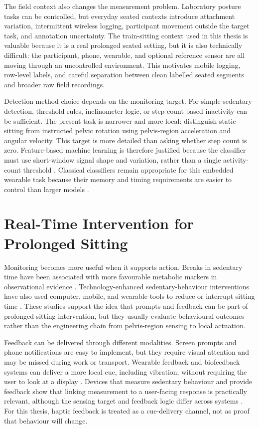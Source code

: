 The field context also changes the measurement problem. Laboratory posture tasks can be controlled, but everyday seated contexts introduce attachment variation, intermittent wireless logging, participant movement outside the target task, and annotation uncertainty. The train-sitting context used in this thesis is valuable because it is a real prolonged seated setting, but it is also technically difficult: the participant, phone, wearable, and optional reference sensor are all moving through an uncontrolled environment. This motivates mobile logging, row-level labels, and careful separation between clean labelled seated segments and broader raw field recordings.

Detection method choice depends on the monitoring target. For simple sedentary detection, threshold rules, inclinometer logic, or step-count-based inactivity can be sufficient. The present task is narrower and more local: distinguish static sitting from instructed pelvic rotation using pelvis-region acceleration and angular velocity. This target is more detailed than asking whether step count is zero. Feature-based machine learning is therefore justified because the classifier must use short-window signal shape and variation, rather than a single activity-count threshold \cite{khan2013exploratory}. Classical classifiers remain appropriate for this embedded wearable task because their memory and timing requirements are easier to control than larger models \cite{bonaccorso2017machine}.

\section{Real-Time Intervention for Prolonged Sitting}

Monitoring becomes more useful when it supports action. Breaks in sedentary time have been associated with more favourable metabolic markers in observational evidence \cite{healy2008breaks}. Technology-enhanced sedentary-behaviour interventions have also used computer, mobile, and wearable tools to reduce or interrupt sitting time \cite{stephenson2017technology_sedentary_meta}. These studies support the idea that prompts and feedback can be part of prolonged-sitting intervention, but they usually evaluate behavioural outcomes rather than the engineering chain from pelvis-region sensing to local actuation.

Feedback can be delivered through different modalities. Screen prompts and phone notifications are easy to implement, but they require visual attention and may be missed during work or transport. Wearable feedback and biofeedback systems can deliver a more local cue, including vibration, without requiring the user to look at a display \cite{battis2024wearable}. Devices that measure sedentary behaviour and provide feedback show that linking measurement to a user-facing response is practically relevant, although the sensing target and feedback logic differ across systems \cite{gill2018sitfit_feedback_validation}. For this thesis, haptic feedback is treated as a cue-delivery channel, not as proof that behaviour will change.

